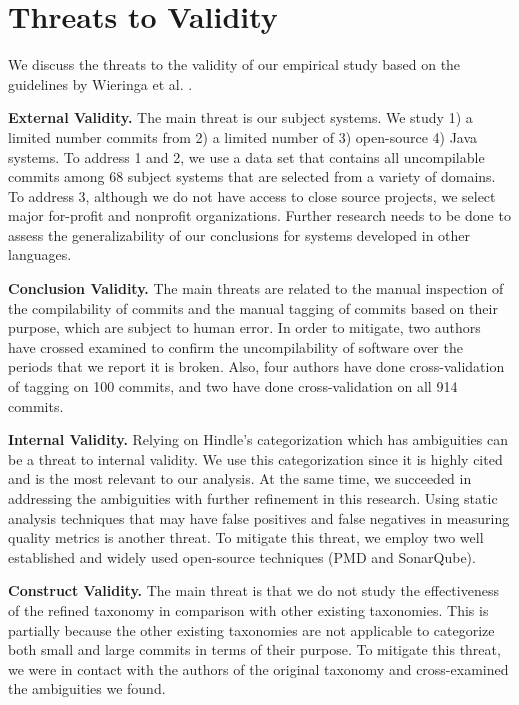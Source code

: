 \section{Threats to Validity}
\label{sec:threats}

We discuss the threats to the validity of our empirical study based on the guidelines by Wieringa et al.
 \cite{38631e0608b54d4299d5707f3a78debf}.


\textbf{External Validity.}
The main threat is our subject systems.
We study 1) a limited number commits from 2) a limited number of 3) open-source 4) Java systems.
To address 1 and 2, we use a data set that contains all uncompilable commits among 68 subject systems that are selected from a variety of domains.
To address 3, although we do not have access to close source projects, we select major for-profit and nonprofit organizations.
Further research needs to be done to assess the generalizability of our conclusions for systems developed in other languages. 

\textbf{Conclusion Validity.}
The main threats are related to the manual inspection of the compilability of commits and the manual tagging of commits based on their purpose, which are subject to human error.
In order to mitigate, two authors have crossed examined to confirm the uncompilability of software over the periods that we report it is broken.
Also, four authors have done cross-validation of tagging on 100 commits, and two have done cross-validation on all 914 commits.

\textbf{Internal Validity.}
Relying on Hindle's categorization which has ambiguities can be a threat to internal validity.
We use this categorization since it is highly cited and is the most relevant to our analysis. At the same time, we succeeded in addressing the ambiguities with further refinement in this research. 
Using static analysis techniques that may have false positives and false negatives in measuring quality metrics is another threat.
To mitigate this threat, we employ two well established and widely used open-source techniques (PMD and SonarQube).

\textbf{Construct Validity.}
The main threat is that we do not study the effectiveness of the refined taxonomy in comparison with other existing taxonomies.
This is partially because the other existing taxonomies are not applicable to categorize both small and large commits in terms of their purpose. 
To mitigate this threat, we were in contact with the authors of the original taxonomy and cross-examined the ambiguities we found.
